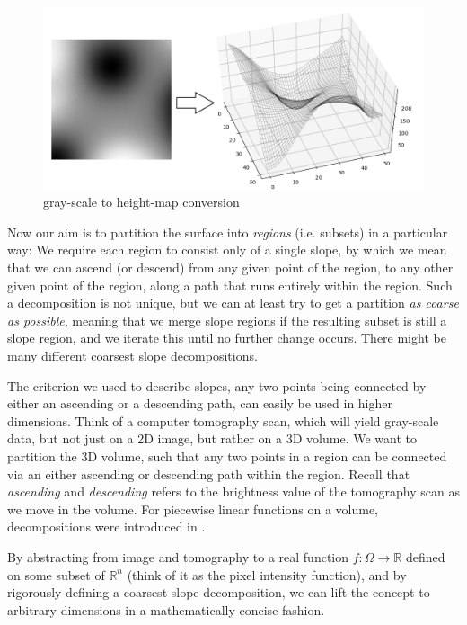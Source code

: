 \documentclass[11pt,twoside,twocolumn,a4paper]{article}
\theoremstyle{plain}
\theoremstyle{definition}
\begin{document}
\begin{figure}
\centering
\includegraphics[width=\columnwidth]{img/visu1.png}
\caption{gray-scale to height-map conversion}
\label{fig:conversion}
\end{figure}

Now our aim is to partition the surface into \emph{regions} (i.e. subsets) in a particular way:
We require each region to consist only of a single slope, by which we mean that we can ascend (or descend) from any given point of the region, to any other given point of the region, along a path that runs entirely within the region.
Such a decomposition is not unique, but we can at least try to get a partition \emph{as coarse as possible}, meaning that we merge slope regions if the resulting subset is still a slope region, and we iterate this until no further change occurs.
There might be many different coarsest slope decompositions.

The criterion we used to describe slopes, any two points being connected by either an ascending or a descending path, can easily be used in higher dimensions.
Think of a computer tomography scan, which will yield gray-scale data, but not just on a 2D image, but rather on a 3D volume.
We want to partition the 3D volume, such that any two points in a region can be connected via an either ascending or descending path within the region.
Recall that \emph{ascending} and \emph{descending} refers to the brightness value of the tomography scan as we move in the volume. For piecewise linear functions on a volume, decompositions were introduced in \cite{edelsbrunner2003morse}. 

By abstracting from image and tomography to a real function $f: \Omega \rightarrow \mathbb{R}$ defined on some subset of $\mathbb{R}^n$ (think of it as the pixel intensity function), and by rigorously defining a coarsest slope decomposition, we can lift the concept to arbitrary dimensions in a mathematically concise fashion.
\end{document}
